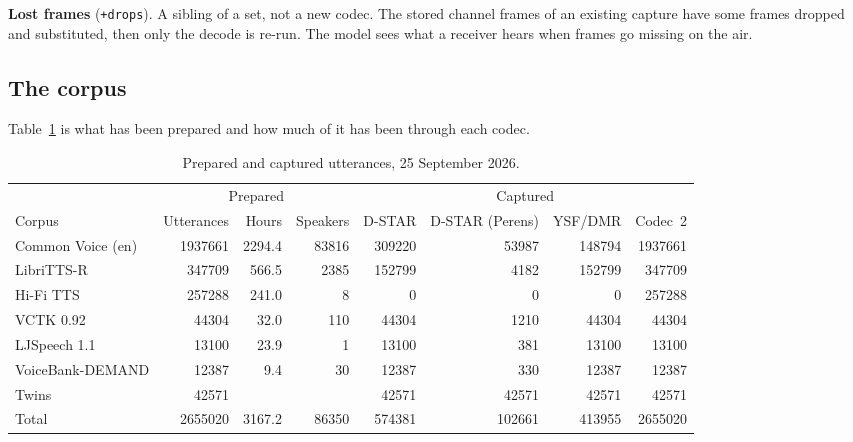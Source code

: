 \documentclass[10pt,twocolumn,a4paper]{article}
\begin{document}
\textbf{Lost frames} (\texttt{+drops}). A sibling of a set, not a new
codec. The stored channel frames of an existing capture have some
frames dropped and substituted, then only the decode is re-run. The
model sees what a receiver hears when frames go missing on the air.

\subsection{The corpus}

Table~\ref{tab:corpus} is what has been prepared and how much of it
has been through each codec.

\begin{table}[t]
  \centering\small
  \caption{Prepared and captured utterances, 25 September 2026.}
  \label{tab:corpus}
  \begin{tabular}{@{}lrrrrrrr@{}}
    \toprule
    & \multicolumn{3}{c}{Prepared} & \multicolumn{4}{c}{Captured} \\
    \cmidrule(lr){2-4}\cmidrule(l){5-8}
    Corpus & Utterances & Hours & Speakers & D-STAR & D-STAR (Perens) & YSF/DMR & Codec~2 \\
    \midrule
    Common Voice (en) \cite{ardila2020commonvoice} & \num{1937661} & 2294.4 & \num{83816} &
    \num{309220} & \num{53987} & \num{148794} & \num{1937661} \\
    LibriTTS-R \cite{koizumi2023librittsr} & \num{347709}  &  566.5 & \num{2385}  &
    \num{152799} & \num{4182} & \num{152799} & \num{347709}  \\
    Hi-Fi TTS \cite{bakhturina2021hifitts} & \num{257288}  &  241.0 & 8           & 0
    & 0 & 0            & \num{257288}  \\
    VCTK 0.92 \cite{yamagishi2019vctk} & \num{44304}   &   32.0 & 110         &
    \num{44304}  & \num{1210} & \num{44304}  & \num{44304}   \\
    LJSpeech 1.1 \cite{ito2017ljspeech} & \num{13100}   &   23.9 & 1           &
    \num{13100}  & \num{381} & \num{13100}  & \num{13100}   \\
    VoiceBank-DEMAND \cite{valentini2017voicebank} & \num{12387}   &    9.4 & 30          &
    \num{12387}  & \num{330} & \num{12387}  & \num{12387}   \\
    Twins             & \num{42571}   &        &             &
    \num{42571}  & \num{42571} & \num{42571}  & \num{42571}   \\
    \midrule
    Total             & \num{2655020} & 3167.2 & \num{86350} &
    \num{574381} & \num{102661} & \num{413955} & \num{2655020} \\
    \bottomrule
  \end{tabular}
\end{table}
\end{document}
